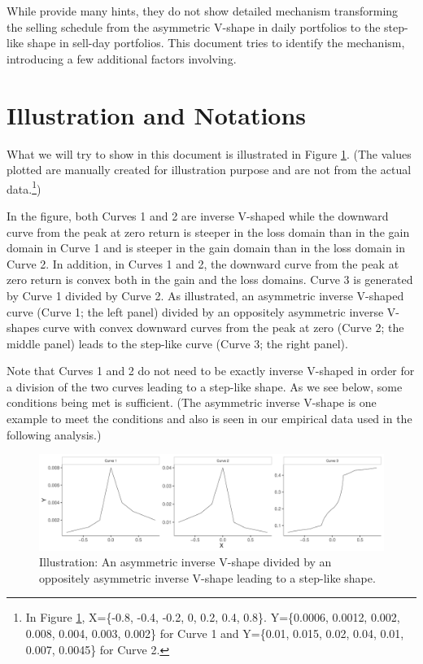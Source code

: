 \documentclass[11pt, a4paper]{article}
\begin{document}
While \citet{BenDavidHirshleifer12} provide many hints, they do not show detailed mechanism transforming the selling schedule from the asymmetric V-shape in daily portfolios to the step-like shape in sell-day portfolios. This document tries to identify the mechanism, introducing a few additional factors involving.      

\section{Illustration and Notations}
What we will try to show in this document is illustrated in Figure \ref{figure:illustration}. (The values plotted are manually created for illustration purpose and are not from the actual data.\footnote{In Figure \ref{figure:illustration}, X=\{-0.8, -0.4, -0.2, 0, 0.2, 0.4, 0.8\}. Y=\{0.0006, 0.0012, 0.002, 0.008, 0.004, 0.003, 0.002\} for Curve 1 and Y=\{0.01, 0.015, 0.02, 0.04, 0.01, 0.007, 0.0045\} for Curve 2.}) 

In the figure, both Curves 1 and 2 are inverse V-shaped while the downward curve from the peak at zero return is steeper in the loss domain than in the gain domain in Curve 1 and is steeper in the gain domain than in the loss domain in Curve 2. In addition, in Curves 1 and 2, the downward curve from the peak at zero return is convex both in the gain and the loss domains. Curve 3 is generated by Curve 1 divided by Curve 2. As illustrated, an asymmetric inverse V-shaped curve (Curve 1; the left panel) divided by an oppositely asymmetric inverse V-shapes curve with convex downward curves from the peak at zero (Curve 2; the middle panel) leads to the step-like curve (Curve 3; the right panel). 

Note that Curves 1 and 2 do not need to be exactly inverse V-shaped in order for a division of the two curves leading to a step-like shape. As we see below, some conditions being met is sufficient. (The asymmetric inverse V-shape is one example to meet the conditions and also is seen in our empirical data used in the following analysis.)


\begin{figure}[H]
	\centering
	\includegraphics[width=1.1\columnwidth]{illustration.pdf}
	\caption{\small Illustration: An asymmetric inverse  V-shape divided by an oppositely asymmetric inverse V-shape leading to a step-like shape.}
	\label{figure:illustration}
\end{figure}
\end{document}
